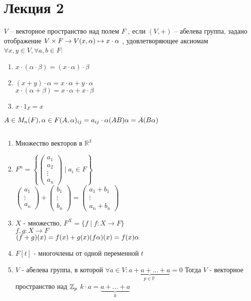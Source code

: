 \documentclass[12pt]{report}
\begin{document}
  \section{Лекция 2} 
\begin{defn}
$V$ -- векторное пространство над полем $F$ , если $(V, +)$ -- абелева группа, задано отображение $V\times F \to V \\ (x, \alpha) \mapsto x \cdot \alpha $ , удовлетворяющее аксиомам $\forall x, y \in V, \forall a, b \in F$:
\begin{enumerate}
    \setcounter{enumi}{+4}
    \item $x \cdot (\alpha \cdot \beta) = (x \cdot \alpha) \cdot \beta$
    \item$ (x + y) \cdot \alpha = x \cdot \alpha + y \cdot \alpha$\\
     $x \cdot (\alpha + \beta) = x \cdot \alpha + x \cdot \beta$
    \item $x \cdot 1_F = x$
\end{enumerate}
\end{defn}

$A \in M_n(F), \alpha \in F \\ (A, \alpha)_{ij} = a_{ij} \cdot \alpha \\ (AB)\alpha = A(B\alpha)$
\begin{exs}$ $
\begin{enumerate}
    \item Множество векторов в $\mathbb R ^3$
    \item $F^n = \left\{ \left( 
	\begin{array}{c} a_1 \\ a_2 \\ \vdots\\ a_n \end{array} \right) \mid a_i \in F \right\}$\\
	$\left(\begin{array}{c}
	    a_1 \\ \vdots \\ a_n 
	\end{array} \right) +
	\left( \begin{array}{c}
		b_1 \\ \vdots \\ b_n
	\end{array} \right)=
	\left( \begin{array}{c}
		a_1 + b_1 \\ \vdots \\ a_n + b_n
	\end{array} \right)$
    \item $X$ - множество, $F^X = \{f \mid f:X \to F\}$ \\
	$f, g: X \to F$\\
	$(f+g)(x) = f(x) + g(x)\\ (f \alpha) (x) = f(x)\alpha$
    \item $F[t]$ - многочлены от одной переменной $t$
    \item $V$ - абелева группа, в которой $\forall a \in V: \underbrace{a + a +\ldots + a}_{p \in \mathbb P} = 0$
	Тогда $V$ - векторное пространство над $\mathbb{Z}_p$
	$k \cdot a = \underbrace{a+ \ldots +a}_{k}$
\end{enumerate}
\end{exs}
\end{document}
